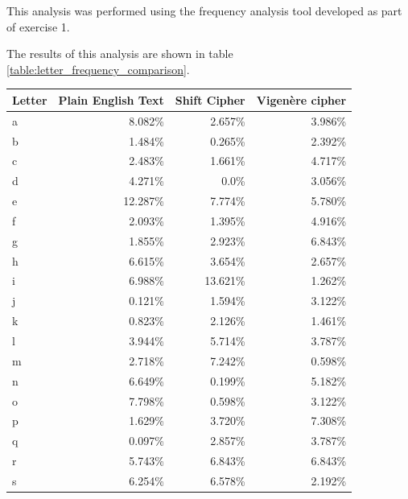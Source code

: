 \documentclass[a4paper]{article}
\newcommand{\Vigenere}{Vigen\`{e}re }
\begin{document}
This analysis was performed using the frequency analysis tool developed as part
of exercise 1.

The results of this analysis are shown in table
\ref{table:letter_frequency_comparison}.

\begin{table}[h]
  \centering
  \begin{tabular}{@{}lrrr@{}}
    \toprule
    Letter & Plain English Text & Shift Cipher & \Vigenere cipher \\
    \midrule
    a      & 8.082\%            & 2.657\%      & 3.986\%          \\
    b      & 1.484\%            & 0.265\%      & 2.392\%          \\
    c      & 2.483\%            & 1.661\%      & 4.717\%          \\
    d      & 4.271\%            & 0.0\%        & 3.056\%          \\
    e      & 12.287\%           & 7.774\%      & 5.780\%          \\
    f      & 2.093\%            & 1.395\%      & 4.916\%          \\
    g      & 1.855\%            & 2.923\%      & 6.843\%          \\
    h      & 6.615\%            & 3.654\%      & 2.657\%          \\
    i      & 6.988\%            & 13.621\%     & 1.262\%          \\
    j      & 0.121\%            & 1.594\%      & 3.122\%          \\
    k      & 0.823\%            & 2.126\%      & 1.461\%          \\
    l      & 3.944\%            & 5.714\%      & 3.787\%          \\
    m      & 2.718\%            & 7.242\%      & 0.598\%          \\
    n      & 6.649\%            & 0.199\%      & 5.182\%          \\
    o      & 7.798\%            & 0.598\%      & 3.122\%          \\
    p      & 1.629\%            & 3.720\%      & 7.308\%          \\
    q      & 0.097\%            & 2.857\%      & 3.787\%          \\
    r      & 5.743\%            & 6.843\%      & 6.843\%          \\
    s      & 6.254\%            & 6.578\%      & 2.192\%          \\

\end{tabular}
\end{table}
\end{document}
